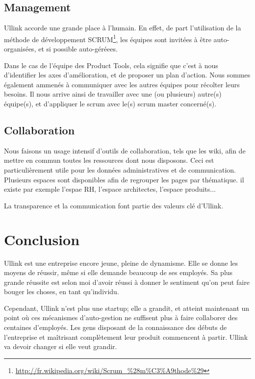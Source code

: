 \documentclass[a4paper, 12pt]{article}
\begin{document}
\subsection{Management}

Ullink accorde une grande place à l'humain. En effet, de part l'utilisation de la méthode de développement SCRUM\footnote{\url{http://fr.wikipedia.org/wiki/Scrum_\%28m\%C3\%A9thode\%29}}, les équipes sont invitées à être auto-organisées, et si possible auto-géréees.

Dans le cas de l'équipe des Product Tools, cela signifie que c'est à nous d'identifier les axes d'amélioration, et de proposer un plan d'action. Nous sommes également ammenés à communiquer avec les autres équipes pour récolter leurs besoins. Il nous arrive ainsi de travailler avec une (ou plusieurs) autre(s) équipe(s), et d'appliquer le scrum avec le(s) scrum master concerné(s).

\subsection{Collaboration}

Nous faisons un usage intensif d'outils de collaboration, tels que les wiki, afin de mettre en commun toutes les ressources dont nous disposons. Ceci est particulièrement utile pour les données administratives et de communication. Plusieurs espaces sont disponibles afin de regrouper les pages par thématique. il existe par exemple l'espae RH, l'espace architectes, l'espace produits...

La transparence et la communication font partie des valeurs clé d'Ullink.

\pagebreak
\section*{Conclusion}

Ullink est une entreprise encore jeune, pleine de dynamisme. Elle se donne les moyens de réussir, même si elle demande beaucoup de ses employés. Sa plus grande réussite est selon moi d'avoir réussi à donner le sentiment qu'on peut faire bouger les choses, en tant qu'individu.

Cependant, Ullink n'est plus une startup; elle a grandit, et atteint maintenant un point où ces mécanismes d'auto-gestion ne suffisent plus à faire collaborer des centaines d'employés. Les gens disposant de la connaissance des débuts de l'entreprise et maîtrisant complètement leur produit commencent à partir. Ullink va devoir changer si elle veut grandir.
\end{document}
